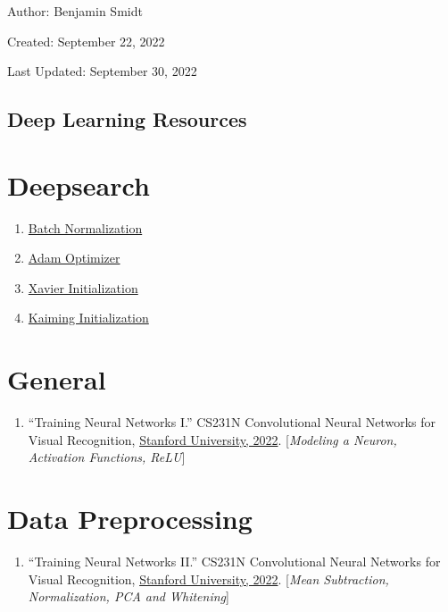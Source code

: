 \documentclass[12pt]{article}
\begin{document}
\noindent Author: Benjamin Smidt

\noindent Created: September 22, 2022

\noindent Last Updated: September 30, 2022
\begin{center}
\section*{Deep Learning Resources}
\end{center}

\tableofcontents{}

\newpage

\section{Deepsearch}

\begin{enumerate}
    \item \href{https://arxiv.org/abs/1502.03167}{Batch Normalization}
    \item \href{https://arxiv.org/abs/1412.6980}{Adam Optimizer}
    \item \href{http://proceedings.mlr.press/v9/glorot10a/glorot10a.pdf}{Xavier Initialization}
    \item \href{https://arxiv.org/abs/1502.01852v1}{Kaiming Initialization}
\end{enumerate}

\section{General}
\begin{enumerate}
    \item “Training Neural Networks I.” 
    CS231N Convolutional Neural Networks for Visual Recognition, 
    \href{https://cs231n.github.io/neural-networks-1/#intro}{Stanford University, 2022}.
    [\emph{Modeling a Neuron, Activation Functions, ReLU}]
\end{enumerate}

\section{Data Preprocessing}
\begin{enumerate}
    \item “Training Neural Networks II.” 
    CS231N Convolutional Neural Networks for Visual Recognition, 
    \href{https://cs231n.github.io/neural-networks-2/#datapre}{Stanford University, 2022}. 
    [\emph{Mean Subtraction, Normalization, PCA and Whitening}]
\end{enumerate}
\end{document}
